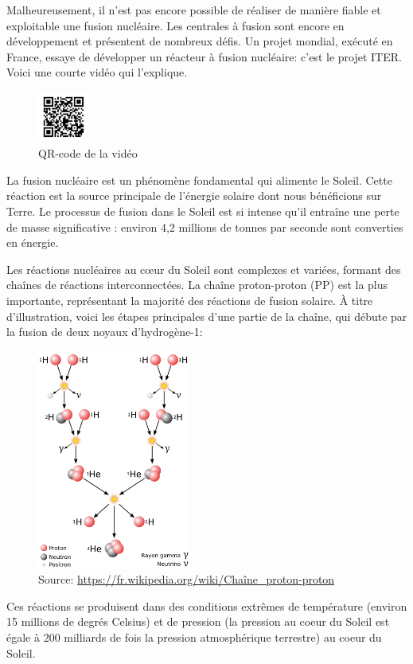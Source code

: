 \documentclass[
  letterpaper,
  DIV=11,
  numbers=noendperiod]{scrartcl}
\begin{document}
Malheureusement, il n'est pas encore possible de réaliser de manière
fiable et exploitable une fusion nucléaire. Les centrales à fusion sont
encore en développement et présentent de nombreux défis. Un projet
mondial, exécuté en France, essaye de développer un réacteur à fusion
nucléaire: c'est le projet ITER. Voici une courte vidéo qui l'explique.

\begin{figure}[H]

{\centering \includegraphics[width=0.15\textwidth,height=\textheight]{figures/ff/video-iter.pdf}

}

\caption{QR-code de la vidéo}

\end{figure}%

La fusion nucléaire est un phénomène fondamental qui alimente le Soleil.
Cette réaction est la source principale de l'énergie solaire dont nous
bénéficions sur Terre. Le processus de fusion dans le Soleil est si
intense qu'il entraîne une perte de masse significative : environ 4,2
millions de tonnes par seconde sont converties en énergie.

Les réactions nucléaires au cœur du Soleil sont complexes et variées,
formant des chaînes de réactions interconnectées. La chaîne
proton-proton (PP) est la plus importante, représentant la majorité des
réactions de fusion solaire. À titre d'illustration, voici les étapes
principales d'une partie de la chaîne, qui débute par la fusion de deux
noyaux d'hydrogène-1:

\begin{figure}[H]

{\centering \includegraphics[width=0.45\textwidth,height=\textheight]{figures/ff/soleil.png}

}

\caption{Source:
\url{https://fr.wikipedia.org/wiki/Chaîne_proton-proton}}

\end{figure}%

Ces réactions se produisent dans des conditions extrêmes de température
(environ 15 millions de degrés Celsius) et de pression (la pression au
coeur du Soleil est égale à 200 milliards de fois la pression
atmosphérique terrestre) au coeur du Soleil.
\end{document}

